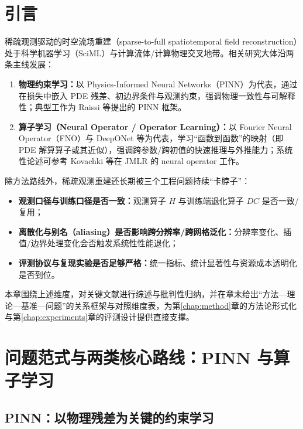 
\section{引言}\label{sec:rw_intro}

稀疏观测驱动的时空流场重建（sparse-to-full spatiotemporal field reconstruction）处于科学机器学习（SciML）与计算流体/计算物理交叉地带。相关研究大体沿两条主线发展：

\begin{enumerate}
  \item \textbf{物理约束学习：}以 Physics-Informed Neural Networks（PINN）为代表，通过在损失中嵌入 PDE 残差、初边界条件与观测约束，强调物理一致性与可解释性；典型工作为 Raissi 等提出的 PINN 框架\cite{raissi2019pinn}。
  \item \textbf{算子学习（Neural Operator / Operator Learning）：}以 Fourier Neural Operator（FNO）与 DeepONet 等为代表，学习“函数到函数”的映射（即 PDE 解算算子或其近似），强调跨参数/跨初值的快速推理与外推能力；系统性论述可参考 Kovachki 等在 JMLR 的 neural operator 工作\cite{kovachki2023neural_operator}。
\end{enumerate}

除方法路线外，稀疏观测重建还长期被三个工程问题持续“卡脖子”：

\begin{itemize}
  \item \textbf{观测口径与训练口径是否一致：}观测算子 $H$ 与训练端退化算子 $DC$ 是否一致/复用；
  \item \textbf{离散化与别名（aliasing）是否影响跨分辨率/跨网格泛化：}分辨率变化、插值/边界处理变化会否触发系统性性能退化；
  \item \textbf{评测协议与复现实验是否足够严格：}统一指标、统计显著性与资源成本透明化是否到位。
\end{itemize}

本章围绕上述维度，对关键文献进行综述与批判性归纳，并在章末给出“方法—理论—基准—问题”的关系框架与对照维度表，为第\ref{chap:method}章的方法论形式化与第\ref{chap:experiments}章的评测设计提供直接支撑。


\section{问题范式与两类核心路线：PINN 与算子学习}\label{sec:rw_routes}

\subsection{PINN：以物理残差为关键的约束学习}\label{subsec:rw_pinn}

